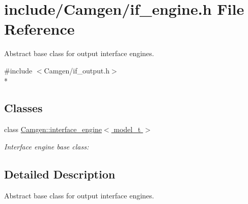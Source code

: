 \hypertarget{a00647}{\section{include/\-Camgen/if\-\_\-engine.h File Reference}
\label{a00647}
}


Abstract base class for output interface engines.  


{\ttfamily \#include $<$Camgen/if\-\_\-output.\-h$>$}\\*
\subsection*{Classes}
\begin{DoxyCompactItemize}
\item 
class \hyperlink{a00314}{Camgen\-::interface\-\_\-engine$<$ model\-\_\-t $>$}
\begin{DoxyCompactList}\small\item\em Interface engine base class\-: \end{DoxyCompactList}\end{DoxyCompactItemize}


\subsection{Detailed Description}
Abstract base class for output interface engines. 